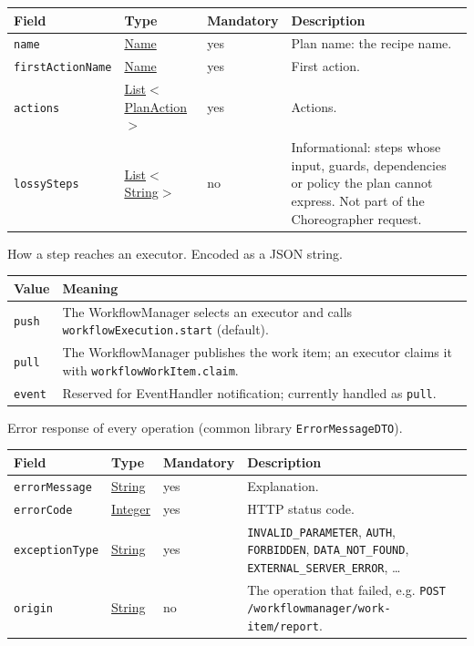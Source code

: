 \documentclass[a4paper]{arrowhead}
\newcommand{\mref}[1]{{\textcolor{ArrowheadPurple}{\hyperref[sec:model:#1]{#1}}}}
\newcommand{\pref}[1]{{\textcolor{ArrowheadGrey}{\hyperref[sec:model:primitives:#1]{#1}}}}
\begin{document}
{\small
\begin{longtable}{|p{3.7cm}|p{4.2cm}|p{1.6cm}|p{6.3cm}|}

\hline
\rowcolor{gray!33} Field & Type & Mandatory & Description \\ \hline
\endhead
\texttt{name} & \pref{Name} & yes & Plan name: the recipe name. \\ \hline
\texttt{firstActionName} & \pref{Name} & yes & First action. \\ \hline
\texttt{actions} & \pref{List}$<$\mref{PlanAction}$>$ & yes & Actions. \\ \hline
\texttt{lossySteps} & \pref{List}$<$\pref{String}$>$ & no & Informational: steps whose input, guards, dependencies or policy the plan cannot express. Not part of the Choreographer request. \\ \hline
\end{longtable}
}

How a step reaches an executor.
 Encoded as a JSON string.
{\small
\begin{longtable}{|p{3.9cm}|p{11.9cm}|}

\hline
\rowcolor{gray!33} Value & Meaning \\ \hline
\endhead
\texttt{push} & The WorkflowManager selects an executor and calls \texttt{workflowExecution.start} (default). \\ \hline
\texttt{pull} & The WorkflowManager publishes the work item; an executor claims it with \texttt{workflowWorkItem.claim}. \\ \hline
\texttt{event} & Reserved for EventHandler notification; currently handled as \texttt{pull}. \\ \hline
\end{longtable}
}

Error response of every operation (common library \texttt{ErrorMessageDTO}).

{\small
\begin{longtable}{|p{3.7cm}|p{4.2cm}|p{1.6cm}|p{6.3cm}|}

\hline
\rowcolor{gray!33} Field & Type & Mandatory & Description \\ \hline
\endhead
\texttt{errorMessage} & \pref{String} & yes & Explanation. \\ \hline
\texttt{errorCode} & \pref{Integer} & yes & HTTP status code. \\ \hline
\texttt{exceptionType} & \pref{String} & yes & \texttt{INVALID\_PARAMETER}, \texttt{AUTH}, \texttt{FORBIDDEN}, \texttt{DATA\_NOT\_FOUND}, \texttt{EXTERNAL\_SERVER\_ERROR}, \ldots \\ \hline
\texttt{origin} & \pref{String} & no & The operation that failed, e.g. \texttt{POST /workflowmanager/work-item/report}. \\ \hline
\end{longtable}
}
\end{document}
